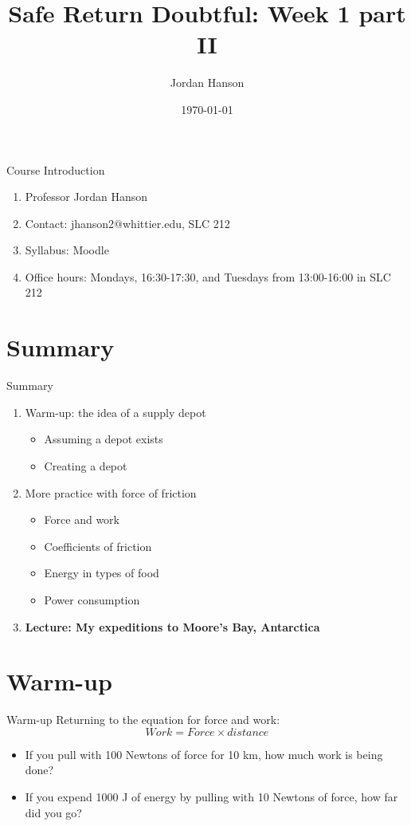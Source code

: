 \documentclass{beamer}
\title{Safe Return Doubtful: Week 1 part II}
\date{\today}
\author{Jordan Hanson}
\institute{Whittier College Department of Physics and Astronomy}
\begin{document}
\maketitle

\begin{frame}{Course Introduction}
\begin{enumerate}
\item Professor Jordan Hanson
\item Contact: jhanson2@whittier.edu, SLC 212
\item Syllabus: Moodle
\item Office hours: Mondays, 16:30-17:30, and Tuesdays from 13:00-16:00 in SLC 212
\end{enumerate}
\end{frame}

\section{Summary}

\begin{frame}{Summary}
\begin{enumerate}
\item Warm-up: the idea of a supply depot
\begin{itemize}
\item Assuming a depot exists
\item Creating a depot
\end{itemize}
\item More practice with force of friction
\begin{itemize}
\item Force and work
\item Coefficients of friction
\item Energy in types of food
\item Power consumption
\end{itemize}
\item \textbf{Lecture: My expeditions to Moore's Bay, Antarctica}
\end{enumerate}
\end{frame}

\section{Warm-up}

\begin{frame}{Warm-up}
Returning to the equation for force and work:
\begin{equation}
Work = Force \times distance
\end{equation}
\begin{itemize}
\item If you pull with 100 Newtons of force for 10 km, how much work is being done?
\item If you expend 1000 J of energy by pulling with 10 Newtons of force, how far did you go?
\end{itemize}
\end{frame}
\end{document}
